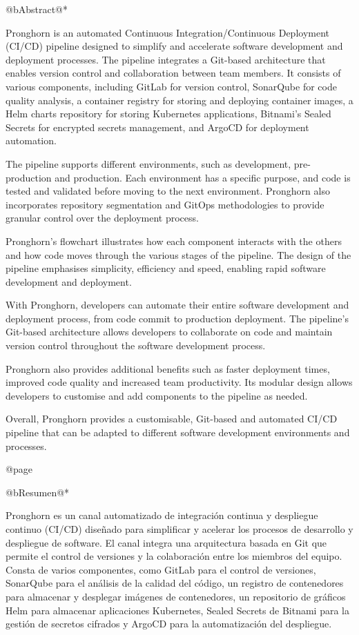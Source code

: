 @b{Abstract}@*

Pronghorn is an automated Continuous Integration/Continuous Deployment (CI/CD) pipeline designed to simplify and accelerate software development and deployment processes. The pipeline integrates a Git-based architecture that enables version control and collaboration between team members. It consists of various components, including GitLab for version control, SonarQube for code quality analysis, a container registry for storing and deploying container images, a Helm charts repository for storing Kubernetes applications, Bitnami's Sealed Secrets for encrypted secrets management, and ArgoCD for deployment automation.

The pipeline supports different environments, such as development, pre-production and production. Each environment has a specific purpose, and code is tested and validated before moving to the next environment. Pronghorn also incorporates repository segmentation and GitOps methodologies to provide granular control over the deployment process.

Pronghorn's flowchart illustrates how each component interacts with the others and how code moves through the various stages of the pipeline. The design of the pipeline emphasises simplicity, efficiency and speed, enabling rapid software development and deployment.

With Pronghorn, developers can automate their entire software development and deployment process, from code commit to production deployment. The pipeline's Git-based architecture allows developers to collaborate on code and maintain version control throughout the software development process.

Pronghorn also provides additional benefits such as faster deployment times, improved code quality and increased team productivity. Its modular design allows developers to customise and add components to the pipeline as needed.

Overall, Pronghorn provides a customisable, Git-based and automated CI/CD pipeline that can be adapted to different software development environments and processes.

@page

@b{Resumen}@*

Pronghorn es un canal automatizado de integración continua y despliegue continuo (CI/CD) diseñado para simplificar y acelerar los procesos de desarrollo y despliegue de software. El canal integra una arquitectura basada en Git que permite el control de versiones y la colaboración entre los miembros del equipo. Consta de varios componentes, como GitLab para el control de versiones, SonarQube para el análisis de la calidad del código, un registro de contenedores para almacenar y desplegar imágenes de contenedores, un repositorio de gráficos Helm para almacenar aplicaciones Kubernetes, Sealed Secrets de Bitnami para la gestión de secretos cifrados y ArgoCD para la automatización del despliegue.

